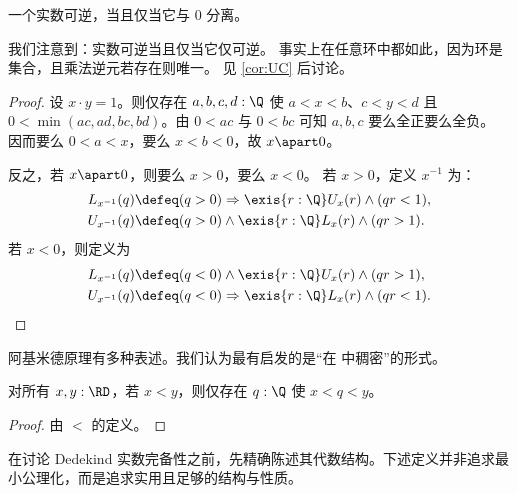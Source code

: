 \begin{thm} \label{RD-inverse-apart-0}
  一个实数可逆，当且仅当它与 $0$ 分离。
\end{thm}

\begin{rmk}
  我们注意到：实数可逆当且仅当它仅可逆。
  事实上在任意环中都如此，因为环是集合，且乘法逆元若存在则唯一。
  见 \cref{cor:UC} 后讨论。
\end{rmk}

\begin{proof}
  设 $x \cdot y = 1$。则仅存在 $a, b, c, d : \Q$ 使
  $a < x < b$、$c < y < d$ 且 $0 < \min (a c, a d, b c, b d)$。由 $0 < a c$ 与 $0 < b c$ 可知
  $a,b,c$ 要么全正要么全负。
  因而要么 $0 < a < x$，要么 $x < b < 0$，故 $x \apart 0$。

  反之，若 $x \apart 0$，则要么 $x > 0$，要么 $x < 0$。
  若 $x > 0$，定义 $x^{-1}$ 为：
  \begin{align*}
    L_{x^{-1}}(q) &\defeq
    (q > 0) \Rightarrow \exis{r : \Q} U_x(r) \land (q r < 1),
    \\
    U_{x^{-1}}(q) &\defeq
    (q > 0) \land \exis{r : \Q} L_x(r) \land (q r > 1).
  \end{align*}
  若 $x < 0$，则定义为
  \begin{align*}
    L_{x^{-1}}(q) &\defeq
    (q < 0) \land \exis{r : \Q} U_x(r) \land (q r > 1),
    \\
    U_{x^{-1}}(q) &\defeq
    (q < 0) \Rightarrow \exis{r : \Q} L_x(r) \land (q r < 1). \qedhere
  \end{align*}
\end{proof}

%
%
%
阿基米德原理有多种表述。我们认为最有启发的是“\Q 在 \RD 中稠密”的形式。

\begin{thm}[\RD 的阿基米德原理] \label{RD-archimedean}
  对所有 $x, y : \RD$，若 $x < y$，则仅存在 $q : \Q$ 使
  $x < q < y$。
\end{thm}

\begin{proof}
  由 $<$ 的定义。
\end{proof}

在讨论 Dedekind 实数完备性之前，先精确陈述其代数结构。下述定义并非追求最小公理化，而是追求实用且足够的结构与性质。

